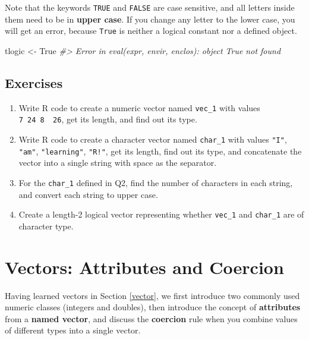 \documentclass[
]{book}
\newenvironment{Shaded}{\begin{snugshade}}{\end{snugshade}}
\newcommand{\CommentTok}[1]{\textcolor[rgb]{0.56,0.35,0.01}{\textit{#1}}}
\newcommand{\NormalTok}[1]{#1}
\newcommand{\OtherTok}[1]{\textcolor[rgb]{0.56,0.35,0.01}{#1}}
\begin{document}
Note that the keywords \texttt{TRUE} and \texttt{FALSE} are case sensitive, and all letters inside them need to be in \textbf{upper case}. If you change any letter to the lower case, you will get an error, because \texttt{True} is neither a logical constant nor a defined object.

\begin{Shaded}
\begin{Highlighting}[]
\NormalTok{tlogic }\OtherTok{\textless{}{-}}\NormalTok{ True}
\CommentTok{\#\textgreater{} Error in eval(expr, envir, enclos): object \textquotesingle{}True\textquotesingle{} not found}
\end{Highlighting}
\end{Shaded}

\hypertarget{exercises-3}{%
\subsection{Exercises}\label{exercises-3}}

\begin{enumerate}
\def\labelenumi{\arabic{enumi}.}
\item
  Write R code to create a numeric vector named \texttt{vec\_1} with values \texttt{7\ 24\ 8\ \ 26}, get its length, and find out its type.
\item
  Write R code to create a character vector named \texttt{char\_1} with values \texttt{"I"}, \texttt{"am"}, \texttt{"learning"}, \texttt{"R!"}, get its length, find out its type, and concatenate the vector into a single string with space as the separator.
\item
  For the \texttt{char\_1} defined in Q2, find the number of characters in each string, and convert each string to upper case.
\item
  Create a length-2 logical vector representing whether \texttt{vec\_1} and \texttt{char\_1} are of character type.
\end{enumerate}

\hypertarget{attr-coercion}{%
\section{Vectors: Attributes and Coercion}\label{attr-coercion}}

Having learned vectors in Section \ref{vector}, we first introduce two commonly used numeric classes (integers and doubles), then introduce the concept of \textbf{attributes} from a \textbf{named vector}, and discuss the \textbf{coercion} rule when you combine values of different types into a single vector.
\end{document}
